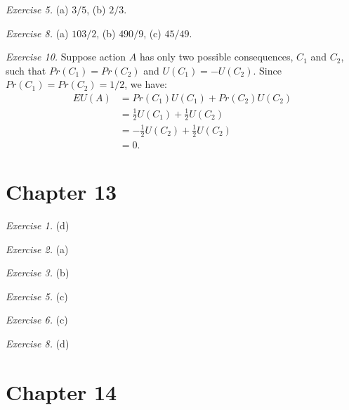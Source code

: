 \documentclass[justified]{tufte-book}
\newcommand{\p}{Pr}
\theoremstyle{definition}
\theoremstyle{definition}
\theoremstyle{definition}
\theoremstyle{definition}
\theoremstyle{remark}
\begin{document}
\vspace{.5em}

\noindent
\emph{Exercise 5.} (a) \(3/5\), (b) \(2/3\).

\vspace{.5em}

\noindent
\emph{Exercise 8.} (a) \(103/2\), (b) \(490/9\), (c) \(45/49\).

\vspace{.5em}

\noindent
\emph{Exercise 10.} Suppose action \(A\) has only two possible consequences, \(C_1\) and \(C_2\), such that \(\p(C_1) = \p(C_2)\) and \(U(C_1) = -U(C_2)\). Since \(\p(C_1) = \p(C_2) = 1/2\), we have:
\[
    \begin{aligned}
      EU(A) 
        &= \p(C_1) U(C_1) + \p(C_2) U(C_2) \\
        &= \frac{1}{2} U(C_1) + \frac{1}{2} U(C_2) \\
        &= -\frac{1}{2} U(C_2) + \frac{1}{2} U(C_2) \\
        &= 0.
    \end{aligned}
  \]

\hypertarget{chapter-13}{%
\section*{Chapter 13}\label{chapter-13}}

\noindent
\emph{Exercise 1.} (d)

\vspace{.5em}

\noindent
\emph{Exercise 2.} (a)

\vspace{.5em}

\noindent
\emph{Exercise 3.} (b)

\vspace{.5em}

\noindent
\emph{Exercise 5.} (c)

\vspace{.5em}

\noindent
\emph{Exercise 6.} (c)

\vspace{.5em}

\noindent
\emph{Exercise 8.} (d)

\hypertarget{chapter-14}{%
\section*{Chapter 14}\label{chapter-14}}
\end{document}
